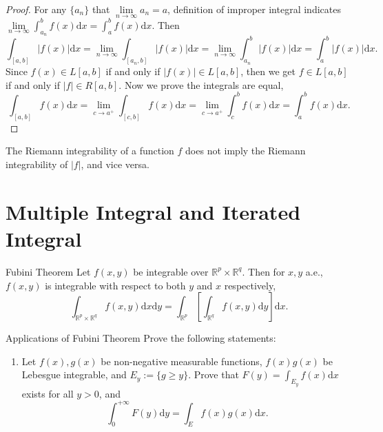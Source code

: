 \begin{proof}
  For any $\{a_n\}$ that $\lim \limits _{n \rightarrow \infty} a_n = a$,
  definition of improper integral indicates
  $\lim \limits _{n \rightarrow \infty} \int_{a_n}^b f(x)\mathrm{d} x = \int_a^b f(x)\mathrm{d} x$.
  Then
  \begin{equation}
    \int_{[a, b]} |f(x)|\mathrm{d} x = \lim \limits _{n \rightarrow \infty} \int_{[a_n, b]} |f(x)|\mathrm{d} x
    = \lim \limits _{n \rightarrow \infty} \int_{a_n}^b |f(x)|\mathrm{d} x = \int_a^b |f(x)| \mathrm{d} x.
  \end{equation}
  Since $f(x) \in L[a, b]$ if and only if $|f(x)| \in L[a, b]$, then we get $f \in L[a,b]$ if and only if $|f| \in R[a,b]$.
  Now we prove the integrals are equal,
  \begin{equation}
    \int_{[a,b]}f(x)\mathrm{d} x= \lim \limits _{c \rightarrow a^+} \int_{[c,b]}f(x)\mathrm{d} x
    = \lim \limits _{c \rightarrow a^+}\int_c^b f(x)\mathrm{d} x = \int_a^b f(x)\mathrm{d} x.
  \end{equation}
\end{proof}

\begin{note}
  The Riemann integrability of a function $f$ does not imply the Riemann integrability of $|f|$,
  and vice versa.
\end{note}

\section{Multiple Integral and Iterated Integral}

\begin{theorem}{Fubini Theorem}{}
  Let $f(x, y)$ be integrable over $\mathbb{R}^p \times \mathbb{R}^q$. Then
  for $x, y$ a.e., $f(x,y)$ is integrable with respect to both $y$ and $x$
  respectively,
  \begin{equation}
    \int_{\mathbb{R}^p \times \mathbb{R}^q} f(x,y)\mathrm{d} x\mathrm{d}y 
    = \int_{\mathbb{R}^p} \left[ \int_{\mathbb{R}^q} f(x,y)\mathrm{d} y \right]\mathrm{d} x.
  \end{equation}
\end{theorem}

\begin{example}{Applications of Fubini Theorem}{}
  Prove the following statements:
  \begin{enumerate}
  \item Let $f(x), g(x)$ be non-negative measurable functions, $f(x)g(x)$ be Lebesgue integrable,
    and $E_y := \{g \geq y\}$.
    Prove that $F(y) = \int_{E_y} f(x)\mathrm{d} x$ exists for all $y > 0$, and
    \begin{equation}
      \int_0^{+\infty} F(y) \mathrm{d} y = \int_E f(x) g(x) \mathrm{d} x.
    \end{equation}
  \end{enumerate}
\end{example}

